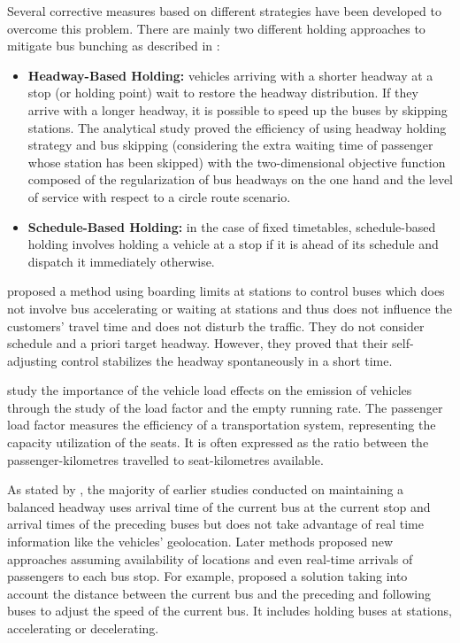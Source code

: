 \documentclass[12pt,a4paper]{article}
\begin{document}
Several corrective measures based on different strategies have been developed to overcome this problem. There are mainly two different holding approaches to mitigate bus bunching as described in \cite{reliability}:

\begin{itemize}
\item \textbf{Headway-Based Holding:} vehicles arriving with a shorter headway at a stop (or holding point) wait to restore the headway distribution. If they arrive with a longer headway, it is possible to speed up the buses by skipping stations. The analytical study \cite{hybrid} proved the efficiency of using headway holding strategy and bus skipping (considering the extra waiting time of passenger whose station has been skipped) with the two-dimensional objective function composed of the regularization of bus headways on the one hand and the level of service with respect to a circle route scenario. 
\item \textbf{Schedule-Based Holding:} in the case of fixed timetables, schedule-based holding involves holding a vehicle at a stop if it is ahead of its schedule and dispatch it immediately otherwise.
\end{itemize}
  
\cite{selfadjusting} proposed a method using boarding limits at stations to control buses which does not involve bus accelerating or waiting at stations and thus does not influence the customers' travel time and does not disturb the traffic. They do not consider schedule and a priori target headway. However, they proved that their self-adjusting control stabilizes the headway spontaneously in a short time. 

\cite{loadFactor} study the importance of the vehicle load effects on the emission of vehicles through the study of the load factor and the empty running rate. The passenger load factor measures the efficiency of a transportation system, representing the capacity utilization of the seats. It is often expressed as the ratio between the passenger-kilometres travelled to seat-kilometres available. 

As stated by \cite{information}, the majority of earlier studies conducted on maintaining a balanced headway uses arrival time of the current bus at the current stop and arrival times of the preceding buses but does not take advantage of real time information like the vehicles' geolocation. Later methods proposed new approaches assuming availability of locations and even real-time arrivals of passengers to each bus stop. For example, \cite{cooperation} proposed a solution taking into account the distance between the current bus and the preceding and following buses to adjust the speed of the current bus. It includes holding buses at stations, accelerating or decelerating. 
\end{document}
